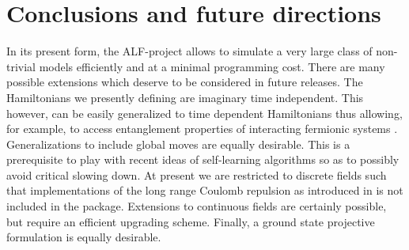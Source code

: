 
\section{Conclusions and future directions}

In its present form, the  ALF-project  allows to simulate a very large class of non-trivial models efficiently and at a minimal  programming cost.  There are many possible extensions which deserve to be considered in future releases.    The Hamiltonians we presently defining are imaginary time independent. This however, can be easily generalized  to time dependent Hamiltonians thus allowing, for example, to access  entanglement properties of interacting fermionic systems \cite{Broecker14,Assaad14,Assaad13a,Assaad15}. Generalizations to include global moves are equally desirable. This is a prerequisite to  play with recent ideas of self-learning algorithms  \cite{Xu16a} so as to  possibly avoid critical slowing down.  At present we are restricted to discrete fields such that  implementations  of  the long range Coulomb repulsion as introduced in \cite{Hohenadler14,Ulybyshev2013,Brower12} is not included in the package.   Extensions  to  continuous fields are certainly possible, but require an efficient upgrading scheme. Finally,  a ground state projective formulation   is equally desirable.
